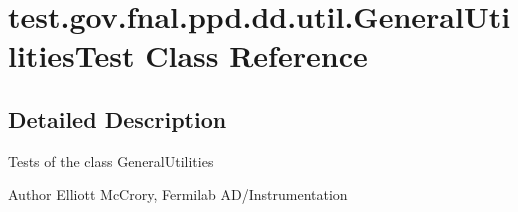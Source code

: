 \hypertarget{classtest_1_1gov_1_1fnal_1_1ppd_1_1dd_1_1util_1_1GeneralUtilitiesTest}{\section{test.\-gov.\-fnal.\-ppd.\-dd.\-util.\-General\-Utilities\-Test Class Reference}
\label{classtest_1_1gov_1_1fnal_1_1ppd_1_1dd_1_1util_1_1GeneralUtilitiesTest}
}


\subsection{Detailed Description}
Tests of the class General\-Utilities

\begin{DoxyAuthor}{Author}
Elliott Mc\-Crory, Fermilab A\-D/\-Instrumentation 
\end{DoxyAuthor}
